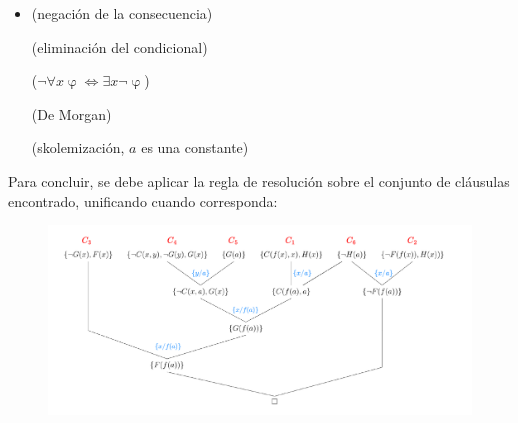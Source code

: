 \documentclass{article}
\begin{document}
\begin{itemize}
        {
        (De Morgan)}

        {
        (extereorizar cuantificador)}


  \item{
        (negación de la consecuencia)}

        {
        (eliminación del condicional)}

        {
        ($\neg \forall x \upvarphi \Leftrightarrow \exists x \neg \upvarphi$)}

        {
        (De Morgan)}

        {
        (skolemización, $a$ es una constante)}
\end{itemize}

Para concluir, se debe aplicar la regla de resolución sobre el conjunto de cláusulas encontrado, unificando cuando corresponda:

\begin{figure}[H]
  \centering
  \includegraphics[width=1.\textwidth]{resolucion_lpo_02.pdf}
\end{figure}
\end{document}
